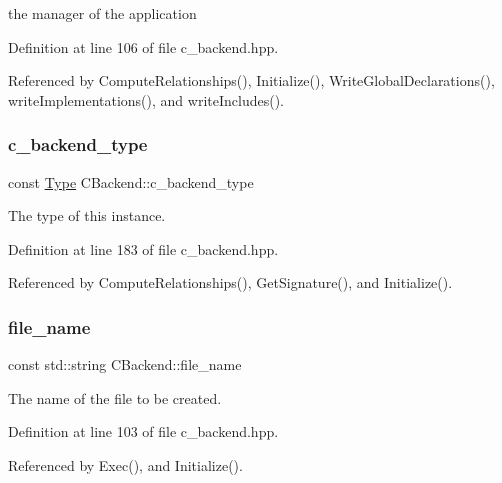 the manager of the application 



Definition at line 106 of file c\+\_\+backend.\+hpp.



Referenced by Compute\+Relationships(), Initialize(), Write\+Global\+Declarations(), write\+Implementations(), and write\+Includes().

\mbox{\label{classCBackend_a2aab793665999e9eb573a5fd10d88dd8}} 
\subsubsection{\texorpdfstring{c\+\_\+backend\+\_\+type}{c\_backend\_type}}
{\footnotesize\ttfamily const \hyperlink{classCBackend_abadfd9ef309ba4d12e648fe2e3fff08b}{Type} C\+Backend\+::c\+\_\+backend\+\_\+type}



The type of this instance. 



Definition at line 183 of file c\+\_\+backend.\+hpp.



Referenced by Compute\+Relationships(), Get\+Signature(), and Initialize().

\mbox{\label{classCBackend_a11ed652bd65b639d749423ff23867161}} 
\subsubsection{\texorpdfstring{file\+\_\+name}{file\_name}}
{\footnotesize\ttfamily const std\+::string C\+Backend\+::file\+\_\+name\hspace{0.3cm}{\ttfamily [protected]}}



The name of the file to be created. 



Definition at line 103 of file c\+\_\+backend.\+hpp.



Referenced by Exec(), and Initialize().

\mbox{\label{classCBackend_a64653afeec4c9a88d1111ab3944449ca}} 

